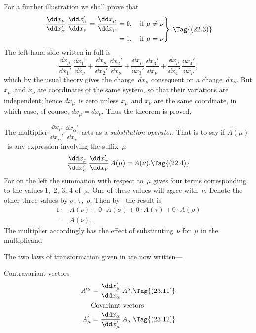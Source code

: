 \documentclass[12pt]{book}
\begin{document}
For a further illustration we shall prove that
\[
\left.
\begin{aligned}
  \frac{\dd x_{\mu}}{\dd x_{\alpha}'}\, \frac{\dd x_{\alpha}'}{\dd x_{\nu}}
  = \frac{\dd x_{\mu}}{\dd x_{\nu}}
  &= 0,\quad \text{if $\mu \neq \nu$} \\
  &= 1,\quad \text{if $\mu = \nu$}
\end{aligned}
\right\}.
\Tag{(22.3)}
\]
The left-hand side written in full is
\[
\frac{\dd x_{\mu}}{\dd x_{1}'}\, \frac{\dd x_{1}'}{\dd x_{\nu}}
+ \frac{\dd x_{\mu}}{\dd x_{2}'}\, \frac{\dd x_{2}'}{\dd x_{\nu}}
+ \frac{\dd x_{\mu}}{\dd x_{3}'}\, \frac{\dd x_{3}'}{\dd x_{\nu}}
+ \frac{\dd x_{\mu}}{\dd x_{4}'}\, \frac{\dd x_{4}'}{\dd x_{\nu}},
\]
which by the usual theory gives the change~$dx_{\mu}$ consequent on a change~$dx_{\nu}$.
But $x_{\mu}$~and $x_{\nu}$ are coordinates of the same system, so that their variations are
independent; hence $dx_{\mu}$~is zero unless $x_{\mu}$~and $x_{\nu}$ are the same coordinate, in
which case, of course, $dx_{\mu} = dx_{\nu}$. Thus the theorem is proved.

The multiplier $\dfrac{\dd x_{\mu}}{\dd x_{\alpha}'}\, \dfrac{\dd x_{\alpha}'}{\dd x_{\nu}}$ acts as a \emph{substitution-operator}. That is to say if
%
$A(\mu)$~is any expression involving the suffix~$\mu$
\[
\frac{\dd x_{\mu}}{\dd x_{\alpha}'}\, \frac{\dd x_{\alpha}'}{\dd x_{\nu}}\, A(\mu) = A(\nu).
\Tag{(22.4)}
\]
For on the left the summation with respect to~$\mu$ gives four terms corresponding
to the values $1$,~$2$, $3$, $4$ of~$\mu$. One of these values will agree with~$\nu$.
Denote the other three values by $\sigma$, $\tau$,~$\rho$. Then by~ the result is
\begin{align*}
  1 \cdot &A(\nu) + 0 \cdot A(\sigma) + 0 \cdot A(\tau) + 0 \cdot A(\rho) \\
  {}={} & A(\nu).
  \end{align*}
The multiplier accordingly has the effect of substituting~$\nu$ for~$\mu$ in the multiplicand.

%

The two laws of transformation given in  are now written---

Contravariant vectors
\begin{align*}
  A'^{\mu} &= \frac{\dd x_{\mu}'}{\dd x_{\alpha}}\, A^{\alpha}.
  \Tag{(23.11)} \\
  \intertext{\hspace*{\parindent}Covariant vectors}
  A_{\mu}' &= \frac{\dd x_{\alpha}}{\dd x_{\mu}'}\, A_{\alpha}.
  \Tag{(23.12)}
\end{align*}
\end{document}

